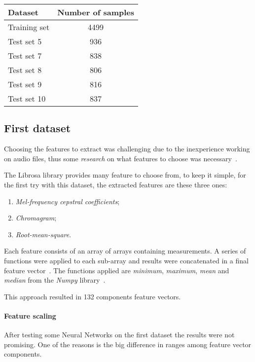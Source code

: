 \begin{center}
    \begin{tabular}{ |l|c| } 
        \hline
        Dataset & Number of samples \\
        \hline
        Training set & 4499 \\
        Test set 5 & 936 \\
        Test set 7 & 838 \\
        Test set 8 & 806 \\
        Test set 9 & 816 \\
        Test set 10 & 837 \\
        \hline
    \end{tabular}
\end{center}

\subsection{First dataset}
Choosing the features to extract was challenging due to the inexperience working on audio files, thus some \emph{research} on what features to 
choose was necessary~\cite{features}.

The Librosa library provides many feature to choose from,
to keep it simple, for the first try with this dataset, the extracted features 
are these three ones: 
\begin{enumerate}
    \item \emph{Mel-frequency cepstral coefficients};
    \item \emph{Chromagram};
    \item \emph{Root-mean-square}.
\end{enumerate}
Each feature consists of an array of arrays containing measurements. 
A series of functions were applied to each sub-array and results 
were concatenated in a final feature vector~\cite{librosa-first}. 
The functions applied are \emph{minimum}, \emph{maximum}, \emph{mean} 
and \emph{median} from the \emph{Numpy} library~\cite{numpy}.

This approach resulted in 132 components feature vectors.

\paragraph{Feature scaling}
After testing some Neural Networks on the first dataset the results 
were not promising. One of the reasons is the big difference in 
ranges among feature vector components.

